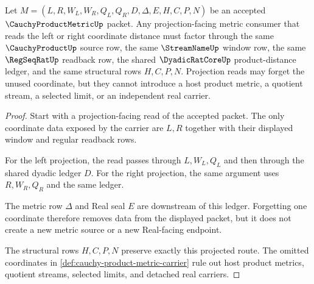 \begin{theorem}
\label{thm:cauchy-product-metric-projection-stability}
Let $M=(L,R,W_L,W_R,Q_L,Q_R,D,\Delta,E,H,C,P,N)$ be an accepted $\CauchyProductMetricUp$ packet. Any projection-facing metric consumer that reads the left or right coordinate distance must factor through the same $\CauchyProductUp$ source row, the same $\StreamNameUp$ window row, the same $\RegSeqRatUp$ readback row, the shared $\DyadicRatCoreUp$ product-distance ledger, and the same structural rows $H,C,P,N$. Projection reads may forget the unused coordinate, but they cannot introduce a host product metric, a quotient stream, a selected limit, or an independent real carrier.
\end{theorem}
\begin{proof}
Start with a projection-facing read of the accepted packet. The only coordinate data exposed by the carrier are $L,R$ together with their displayed window and regular readback rows.

For the left projection, the read passes through $L,W_L,Q_L$ and then through the shared dyadic ledger $D$. For the right projection, the same argument uses $R,W_R,Q_R$ and the same ledger.

The metric row $\Delta$ and Real seal $E$ are downstream of this ledger. Forgetting one coordinate therefore removes data from the displayed packet, but it does not create a new metric source or a new Real-facing endpoint.

The structural rows $H,C,P,N$ preserve exactly this projected route. The omitted coordinates in \autoref{def:cauchy-product-metric-carrier} rule out host product metrics, quotient streams, selected limits, and detached real carriers.
\end{proof}

